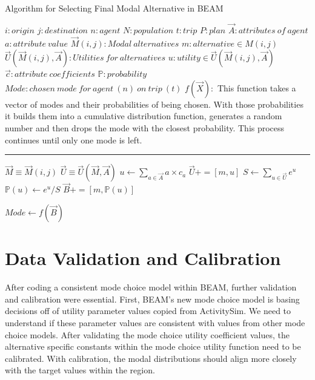 \documentclass[12pt, oneside, openright]{byuthesis}
\begin{document}
\begin{algorithm}
\caption{Algorithm for Selecting Final Modal Alternative in BEAM}
\begin{algorithmic}[1]
\Require
\State $i : origin$
\State $j : destination$
\State $n: agent$
\State $N: population$
\State $t : trip $
\State $P : plan$
\State $\vec{A}: attributes\:of\:agent$
\State $a: attribute\:value$
\State $\vec{M}(i,j) : Modal\:alternatives$
\State $m : alternative \in M(i,j)$
\State $\vec{U}(\vec{M}(i,j),\vec{A}):Utilities\:for\:alternatives$
\State $u: utility \in \vec{U}(\vec{M}(i,j),\vec{A})$
\State $\vec{c}: attribute\:coefficients$
\State $\mathds{P}: probability$
\State $Mode: chosen\:mode\:for\:agent\:(n)\:on\:trip\:(t)$
\State $f(\vec{X}):$
This function takes a vector of modes and  their probabilities of being chosen. With those probabilities it builds them into a cumulative distribution function, generates a random number and then drops the mode with the closest probability. This process continues until only one mode is left.
\vspace{4pt}\hrule\vspace{5pt}

\State $\vec{M} \equiv \vec{M}(i,j)$
\State $\vec{U} \equiv \vec{U}(\vec{M},\vec{A})$
  \State $u \gets \sum_{a\in \vec{A}} a \times c_a$
  \State $\vec{U} += [m,u]$
\EndFor
\State $S \gets \sum_{u\in \vec{U}}e^u$
    \State $\mathds{P}(u)\gets e^u / S$
    \State $\vec{B} +=[m, \mathds{P}(u)]$
\EndFor 

\State $Mode \gets f(\vec{B})$

\EndProcedure

\EndFor
\EndFor
\Statex
\end{algorithmic}
\end{algorithm}

\hypertarget{mcalib}{%
\section{Data Validation and Calibration}\label{mcalib}}

After coding a consistent mode choice model within BEAM, further validation and calibration were essential. First, BEAM's new mode choice model is basing decisions off of utility parameter values copied from ActivitySim. We need to understand if these parameter values are consistent with values from other mode choice models. After validating the mode choice utility coefficient values, the alternative specific constants within the mode choice utility function need to be calibrated. With calibration, the modal distributions should align more closely with the target values within the region.
\end{document}
